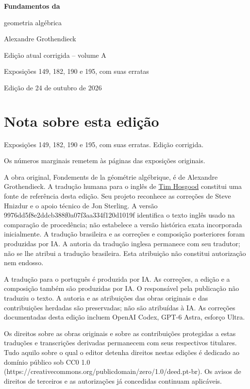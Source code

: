 \documentclass[11pt,twoside,openany]{book}
\numberwithin{equation}{section}
\theoremstyle{plain}
\theoremstyle{definition}
\theoremstyle{remark}
\begin{document}
\frontmatter
\begin{titlepage}
\centering
\vspace*{0.13\textheight}
{\Huge\bfseries Fundamentos da\par geometria algébrica\par}
\vspace{1.5\baselineskip}
{\Large Alexandre Grothendieck\par}
\vfill
{\Large Edição atual corrigida -- volume A\par}
\vspace{\baselineskip}
{\large Exposições 149, 182, 190 e 195, com suas erratas\par}
\vspace{1.5\baselineskip}
{\normalsize Edição de 24 de outubro de 2026\par}
\end{titlepage}
\chapter*{Nota sobre esta edição}
Exposições 149, 182, 190 e 195, com suas erratas. Edição corrigida.

Os números marginais remetem às páginas das exposições originais.

A obra original, Fondements de la géométrie algébrique, é de Alexandre Grothendieck. A tradução humana para o inglês de \href{https://github.com/thosgood/fga/tree/9976dd5f8e2ddcb388f0a07f3aa334f120d1019f}{Tim Hosgood} constitui uma fonte de referência desta edição. Seu projeto reconhece as correções de Steve Hnizdur e o apoio técnico de Jon Sterling. A versão 9976dd5f8e2ddcb388f0a07f3aa334f120d1019f identifica o texto inglês usado na comparação de procedência; não estabelece a versão histórica exata incorporada inicialmente. A tradução brasileira e as correções e composição posteriores foram produzidas por IA. A autoria da tradução inglesa permanece com seu tradutor; não se lhe atribui a tradução brasileira. Esta atribuição não constitui autorização nem endosso.

A tradução para o português é produzida por IA. As correções, a edição e a composição também são produzidas por IA. O responsável pela publicação não traduziu o texto. A autoria e as atribuições das obras originais e das contribuições herdadas são preservadas; não são atribuídas à IA. As correções documentadas desta edição incluem OpenAI Codex, GPT-6 Astra, esforço Ultra.

Os direitos sobre as obras originais e sobre as contribuições protegidas a estas traduções e transcrições derivadas permanecem com seus respectivos titulares. Tudo aquilo sobre o qual o editor detenha direitos nestas edições é dedicado ao domínio público sob CC0 1.0 (https://creativecommons.org/publicdomain/zero/1.0/deed.pt-br). Os avisos de direitos de terceiros e as autorizações já concedidas continuam aplicáveis.
\end{document}
